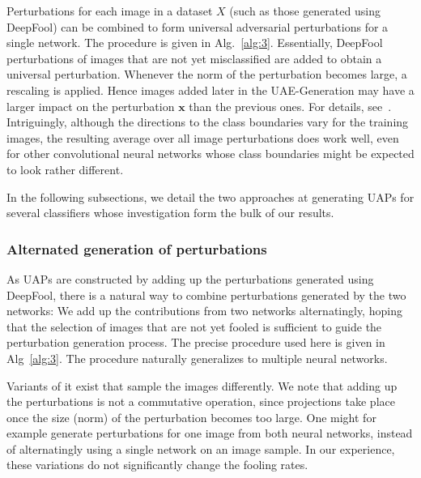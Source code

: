 \documentclass[runningheads]{llncs}
\newcommand{\xb}{\ensuremath{\mathbf{x}}}
\begin{document}
Perturbations for each image in a dataset $X$ (such as those generated using DeepFool) can be combined to form universal adversarial perturbations for a single network. The procedure is given in Alg.~\ref{alg:3}. Essentially, DeepFool perturbations of images that are not yet misclassified are added to obtain a universal perturbation. Whenever the norm of the perturbation becomes large, a rescaling is applied. Hence images added later in the UAE-Generation may have a larger impact on the perturbation $\xb$ than the previous ones. For details, see~\cite{moosavi-dezfooli_universal_2017}. 
Intriguingly, although the directions to the class boundaries vary for the training images, the resulting average over all image perturbations does work well, even for other convolutional neural networks whose class boundaries might be expected to look rather different. 

In the following subsections, we detail the two approaches at generating UAPs for several classifiers whose investigation form the bulk of our results.

\subsubsection{Alternated generation of perturbations}
As UAPs are constructed by adding up the perturbations generated using DeepFool, there is a natural way to combine perturbations generated by the two networks: We add up the contributions from two networks alternatingly, hoping that the selection of images that are not yet fooled is sufficient to guide the perturbation generation process. The precise procedure used here is given in Alg~\ref{alg:3}. The procedure naturally generalizes to multiple neural networks. 

Variants of it exist that sample the images differently. We note that adding up the perturbations is not a commutative operation, since projections take place once the size (norm) of the perturbation becomes too large. One might for example generate perturbations for one image from both neural networks, instead of alternatingly using a single network on an image sample. In our experience, these variations do not significantly change the fooling rates.
 
\end{document}

